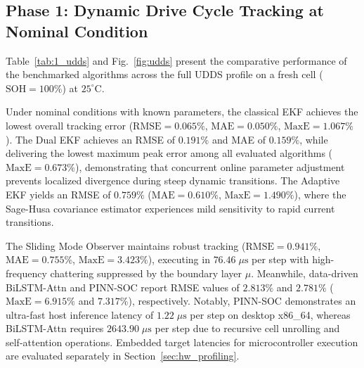 \documentclass[balance,nocopyright,upint,varvw,hyphenate,barcolor=NavyBlue,nolists]{asmejour}
\begin{document}
\subsection{Phase 1: Dynamic Drive Cycle Tracking at Nominal Condition}
Table~\ref{tab:1_udds} and Fig.~\ref{fig:udds} present the comparative performance of the benchmarked algorithms across the full UDDS profile on a fresh cell ($\text{SOH} = 100\%$) at $25^\circ\text{C}$.

Under nominal conditions with known parameters, the classical EKF achieves the lowest overall tracking error ($\text{RMSE} = 0.065\%$, $\text{MAE} = 0.050\%$, $\text{MaxE} = 1.067\%$). The Dual EKF achieves an RMSE of $0.191\%$ and MAE of $0.159\%$, while delivering the lowest maximum peak error among all evaluated algorithms ($\text{MaxE} = 0.673\%$), demonstrating that concurrent online parameter adjustment prevents localized divergence during steep dynamic transitions. The Adaptive EKF yields an RMSE of $0.759\%$ ($\text{MAE} = 0.610\%$, $\text{MaxE} = 1.490\%$), where the Sage-Husa covariance estimator experiences mild sensitivity to rapid current transitions. 

The Sliding Mode Observer maintains robust tracking ($\text{RMSE} = 0.941\%$, $\text{MAE} = 0.755\%$, $\text{MaxE} = 3.423\%$), executing in $76.46\;\mu\text{s}$ per step with high-frequency chattering suppressed by the boundary layer $\mu$. Meanwhile, data-driven BiLSTM-Attn and PINN-SOC report RMSE values of $2.813\%$ and $2.781\%$ ($\text{MaxE} = 6.915\%$ and $7.317\%$), respectively. Notably, PINN-SOC demonstrates an ultra-fast host inference latency of $1.22\;\mu\text{s}$ per step on desktop x86\_64, whereas BiLSTM-Attn requires $2643.90\;\mu\text{s}$ per step due to recursive cell unrolling and self-attention operations. Embedded target latencies for microcontroller execution are evaluated separately in Section~\ref{sec:hw_profiling}.

\begin{table}[t]
\caption{Benchmark results under UDDS dynamic schedule at nominal condition ($25^\circ\text{C}$, $100\%$ SOH). Host latency measured on desktop x86\_64 CPU (Python 3.10 / NumPy / PyTorch, batch size = 1).\label{tab:1_udds}}
%
\end{table}
\end{document}
